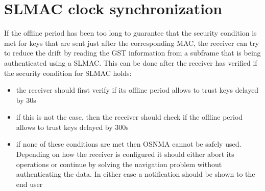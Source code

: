 \section{SLMAC clock synchronization}
If the offline period has been too long to guarantee that the security condition
is met for keys that are sent just after the corresponding MAC, the receiver can
try to reduce the drift by reading the GST information from a subframe that is
being authenticated using a SLMAC. This can be done after the receiver has
verified if the security condition for SLMAC holds:
\begin{itemize}
  \item the receiver should first verify if its offline period allows to trust
    keys delayed by \num{30}\si{s}
  \item if this is not the case, then the receiver should check if the offline
    period allows to trust keys delayed by \num{300}\si{s}
  \item if none of these conditions are met then OSNMA cannot be safely used.
    Depending on how the receiver is configured it should either abort its
    operations or continue by solving the navigation problem without
    authenticating the data. In either case a notification should be shown to
    the end user
\end{itemize}

